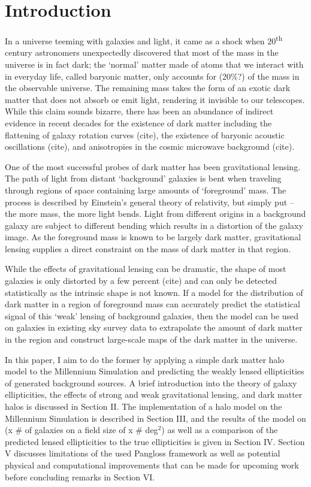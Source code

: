 \documentclass[%
 reprint,
 amsmath,amssymb,
 aps,
]{revtex4-1}
\begin{document}

\section{Introduction}

In a universe teeming with galaxies and light, it came as a shock when 20\textsuperscript{th} century astronomers unexpectedly discovered that most of the mass in the universe is in fact dark; the `normal' matter made of atoms that we interact with in everyday life, called baryonic matter, only accounts for (20\%?) of the mass in the observable universe. The remaining mass takes the form of an exotic dark matter that does not absorb or emit light, rendering it invisible to our telescopes. While this claim sounds bizarre, there has been an abundance of indirect evidence in recent decades for the existence of dark matter including the flattening of galaxy rotation curves (cite), the existence of baryonic acoustic oscillations (cite), and anisotropies in the cosmic microwave background (cite).

One of the most successful probes of dark matter has been gravitational lensing. The path of light from distant `background' galaxies is bent when traveling through regions of space containing large amounts of `foreground' mass. The process is described by Einstein's general theory of relativity, but simply put -- the more mass, the more light bends. Light from different origins in a background galaxy are subject to different bending which results in a distortion of the galaxy image. As the foreground mass is known to be largely dark matter, gravitational lensing supplies a direct constraint on the mass of dark matter in that region.

While the effects of gravitational lensing can be dramatic, the shape of most galaxies is only distorted by a few percent (cite) and can only be detected statistically as the intrinsic shape is not known. If a model for the distribution of dark matter in a region of foreground mass can accurately predict the statistical signal of this `weak' lensing of background galaxies, then the model can be used on galaxies in existing sky survey data to extrapolate the amount of dark matter in the region and construct large-scale maps of the dark matter in the universe.

In this paper, I aim to do the former by applying a simple dark matter halo model to the Millennium Simulation and predicting the weakly lensed ellipticities of generated background sources. A brief introduction into the theory of galaxy ellipticities, the effects of strong and weak gravitational lensing, and dark matter halos is discussed in Section II. The implementation of a halo model on the Millennium Simulation is described in Section III, and the results of the model on (x \# of galaxies on a field size of x \# deg$^2$) as well as a comparison of the predicted lensed ellipticities to the true ellipticities is given in Section IV.  Section V discusses limitations of the used Pangloss framework as well as potential physical and computational improvements that can be made for upcoming work before concluding remarks in Section VI.
\end{document}

